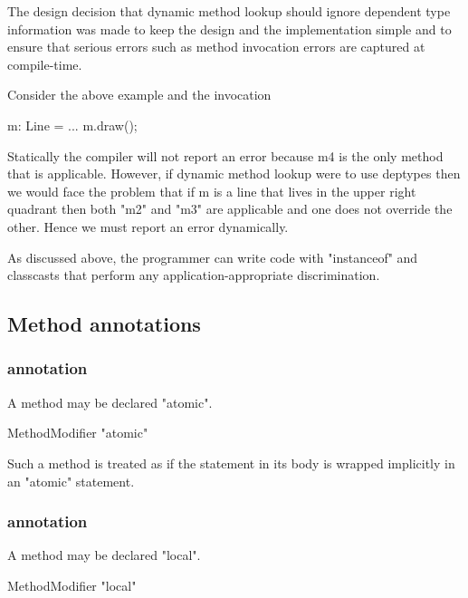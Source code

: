 \begin{rationale}
  The design decision that dynamic method lookup should ignore
  dependent type information was made to keep the design and the
  implementation simple and to ensure that serious errors such as
  method invocation errors are captured at compile-time.
 
  Consider the above example and the invocation
\begin{xten}
m: Line = ...
m.draw();    
\end{xten}


   Statically the compiler will not report an error because m4 is the
   only method that is applicable. However, if dynamic method lookup
   were to use deptypes then we would face the problem that if m is a
   line that lives in the upper right quadrant then both \xcd"m2"
   and \xcd"m3"
   are applicable and one does not override the other. Hence we must
   report an error dynamically.

   As discussed above, the programmer can write code with \xcd"instanceof"
   and classcasts that perform any application-appropriate
   discrimination.  
\end{rationale}

\subsection{Method annotations}

\subsubsection{ annotation}

A method may be declared \xcd"atomic".

\begin{grammar}
  MethodModifier \: \xcd"atomic"  
\end{grammar}

Such a method is treated as if the statement in its body is wrapped 
implicitly in an \xcd"atomic" statement.

\subsubsection{ annotation}\label{LocalAnnotation}

A method may be declared \xcd"local".

\begin{grammar}
  MethodModifier \: \xcd"local"  
\end{grammar}

